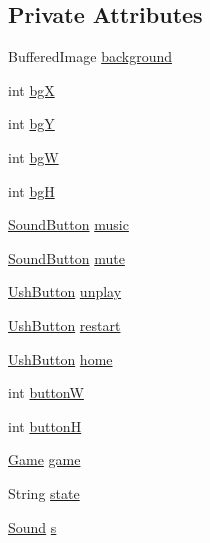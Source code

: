 \subsection*{Private Attributes}
\begin{DoxyCompactItemize}
\item 
Buffered\+Image \hyperlink{classui_1_1_pause_overlay_a714354485419fb2b615f17fcce85657e}{background}
\item 
int \hyperlink{classui_1_1_pause_overlay_ad0da7bd85c0de36e566b34e77130b963}{bgX}
\item 
int \hyperlink{classui_1_1_pause_overlay_a74c70095eb1e52df9026427e3cd9eb51}{bgY}
\item 
int \hyperlink{classui_1_1_pause_overlay_a17417a7ee75933f11813cf521afcbb83}{bgW}
\item 
int \hyperlink{classui_1_1_pause_overlay_ae7adc5e3b95d5351ce811cb737e87643}{bgH}
\item 
\hyperlink{classui_1_1_sound_button}{Sound\+Button} \hyperlink{classui_1_1_pause_overlay_a51eb690d73e3d030b601347960869eee}{music}
\item 
\hyperlink{classui_1_1_sound_button}{Sound\+Button} \hyperlink{classui_1_1_pause_overlay_add0afaaaa9514183e3d9a30657189f25}{mute}
\item 
\hyperlink{classui_1_1_ush_button}{Ush\+Button} \hyperlink{classui_1_1_pause_overlay_adf4b295ca065e549d8c0d4d409309b78}{unplay}
\item 
\hyperlink{classui_1_1_ush_button}{Ush\+Button} \hyperlink{classui_1_1_pause_overlay_ac1d34384911014e49613ccfb1abddbcc}{restart}
\item 
\hyperlink{classui_1_1_ush_button}{Ush\+Button} \hyperlink{classui_1_1_pause_overlay_ad61cb0033da8c6cb2637bf126bf9b17e}{home}
\item 
int \hyperlink{classui_1_1_pause_overlay_aa672c7263d0ea6f8e7440cd255731792}{buttonW}
\item 
int \hyperlink{classui_1_1_pause_overlay_ad479f88a73d5ad31bab94bb8db7ea2c2}{buttonH}
\item 
\hyperlink{classprogetto_1_1_game}{Game} \hyperlink{classui_1_1_pause_overlay_ac6a5ed6191fcf3a5bf0445921feb4f48}{game}
\item 
String \hyperlink{classui_1_1_pause_overlay_a91ac952876f776b3fbbc8519e093fdbf}{state}
\item 
\hyperlink{classprogetto_1_1_sound}{Sound} \hyperlink{classui_1_1_pause_overlay_a76e9e53c877d84187e0efb78f03c86d4}{s}
\end{DoxyCompactItemize}


